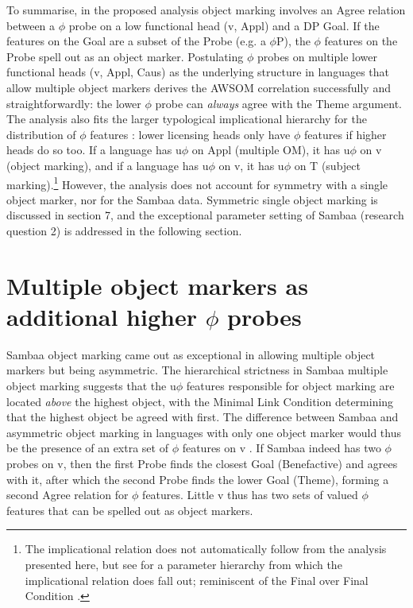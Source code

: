 \documentclass[output=paper
,modfonts
,nonflat]{langsci/langscibook}
\begin{document}
To summarise, in the proposed analysis object marking involves an Agree relation between a $\phi$ probe on a low functional head (v, Appl) and a DP Goal. If the features on the Goal are a subset of the Probe (e.g. a $\phi$P), the $\phi$ features on the Probe spell out as an object marker. Postulating $\phi$ probes on multiple lower functional heads (v, Appl, Caus) as the underlying structure in languages that allow multiple object markers derives the AWSOM correlation successfully and straightforwardly: the lower $\phi$ probe can \textit{always} agree with the Theme argument. The analysis also fits the larger typological implicational hierarchy for the distribution of $\phi$ features \citep{Moravcsik1974, Givón1976}: lower licensing heads only have $\phi$ features if higher heads do so too. If a language has u$\phi$ on Appl (multiple OM), it has u$\phi$ on v (object marking), and if a language has u$\phi$ on v, it has u$\phi$ on T (subject marking).\footnote{The implicational relation does not automatically follow from the analysis presented here, but see \citet{Van_der_WalTA} for a parameter hierarchy from which the implicational relation does fall out; reminiscent of the Final over Final Condition \citep{Sheehan_et_al2017}.} However, the analysis does not account for symmetry with a single object marker, nor for the Sambaa data. Symmetric single object marking is discussed in section 7, and the exceptional parameter setting of Sambaa (research question 2) is addressed in the following section. 

\section{Multiple object markers as additional higher $\phi$ probes}

Sambaa object marking came out as exceptional in allowing multiple object markers but being asymmetric. The hierarchical strictness in Sambaa multiple object marking suggests that the u$\phi$ features responsible for object marking are located \textit{above} the highest object, with the Minimal Link Condition determining that the highest object be agreed with first. The difference between Sambaa and asymmetric object marking in languages with only one object marker would thus be the presence of an extra set of $\phi$ features on v \citep{Adams2010}. If Sambaa indeed has two $\phi$ probes on v, then the first Probe finds the closest Goal (Benefactive) and agrees with it, after which the second Probe finds the lower Goal (Theme), forming a second Agree relation for $\phi$ features. Little v thus has two sets of valued $\phi$ features that can be spelled out as object markers.
 
\end{document}
